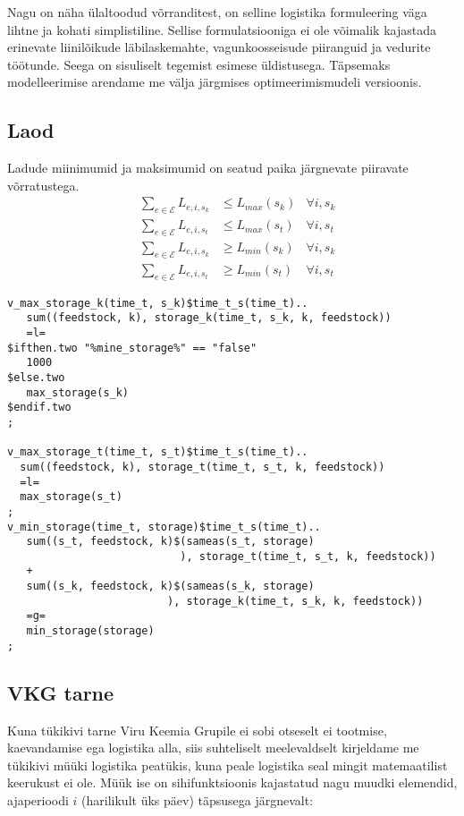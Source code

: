 \documentclass[10pt,a4paper]{article}
\begin{document}
Nagu on näha ülaltoodud võrranditest, on selline logistika formuleering väga lihtne ja kohati simplistiline. Sellise formulatsiooniga ei ole võimalik kajastada erinevate liinilõikude läbilaskemahte, vagunkoosseisude piiranguid ja vedurite töötunde. Seega on sisuliselt tegemist esimese üldistusega. Täpsemaks modelleerimise arendame me välja järgmises optimeerimismudeli versioonis.

\subsection{Laod}
Ladude miinimumid ja maksimumid on seatud paika järgnevate piiravate võrratustega.
\begin{align}
&\sum_{e\in \mathcal{E}} L_{e,i,s_k} & \leq \mathit{L}_{max}(s_k) &\forall i, s_k \\
&\sum_{e\in \mathcal{E}} L_{e,i,s_t} & \leq \mathit{L}_{max}(s_t) &\forall i, s_t \\
&\sum_{e\in \mathcal{E}} L_{e,i,s_k} & \geq \mathit{L}_{min}(s_k) &\forall i, s_k \\
&\sum_{e\in \mathcal{E}} L_{e,i,s_t} & \geq \mathit{L}_{min}(s_t) &\forall i, s_t
\end{align}
\begin{verbatim}
v_max_storage_k(time_t, s_k)$time_t_s(time_t)..
   sum((feedstock, k), storage_k(time_t, s_k, k, feedstock))
   =l=
$ifthen.two "%mine_storage%" == "false"
   1000
$else.two
   max_storage(s_k)
$endif.two
;

v_max_storage_t(time_t, s_t)$time_t_s(time_t)..
  sum((feedstock, k), storage_t(time_t, s_t, k, feedstock))
  =l=
  max_storage(s_t)
;
v_min_storage(time_t, storage)$time_t_s(time_t)..
   sum((s_t, feedstock, k)$(sameas(s_t, storage)
                           ), storage_t(time_t, s_t, k, feedstock))
   +
   sum((s_k, feedstock, k)$(sameas(s_k, storage)
                         ), storage_k(time_t, s_k, k, feedstock))
   =g=
   min_storage(storage)
;
\end{verbatim}

\subsection{VKG tarne}
Kuna tükikivi tarne Viru Keemia Grupile ei sobi otseselt ei tootmise, kaevandamise ega logistika alla, siis suhteliselt meelevaldselt kirjeldame me tükikivi müüki logistika peatükis, kuna peale logistika seal mingit matemaatilist keerukust ei ole. Müük ise on sihifunktsioonis kajastatud nagu muudki elemendid, ajaperioodi $i$ (harilikult üks päev) täpsusega järgnevalt:
\end{document}
